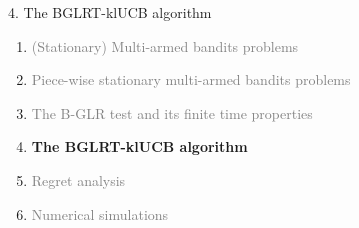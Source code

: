 \documentclass[11pt,english,ignorenonframetext,]{beamer}
\begin{document}
\begin{frame}{4. The BGLRT-klUCB algorithm}

  \begin{enumerate}
    \item
    \textcolor{gray}{
      (Stationary) Multi-armed bandits problems
    }
    \vspace*{15pt}

    \item
    \textcolor{gray}{
      Piece-wise stationary multi-armed bandits problems
    }
    \vspace*{15pt}

    \item
    \textcolor{gray}{
      The B-GLR test and its finite time properties
    }
    \vspace*{15pt}

    \item
    \alert{\textbf{%
      The BGLRT-klUCB algorithm
    }}
    \vspace*{15pt}

    \item
    \textcolor{gray}{
      Regret analysis
    }
    \vspace*{15pt}

    \item
    \textcolor{gray}{
      Numerical simulations
    }
  \end{enumerate}

\end{frame}
\end{document}
